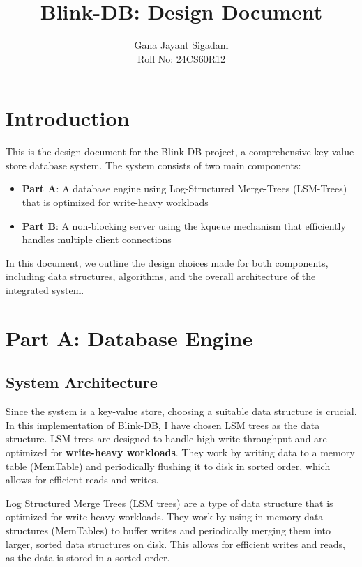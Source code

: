 \documentclass{article}
\title{Blink-DB: Design Document}
\author{
      Gana Jayant Sigadam \\
      Roll No: 24CS60R12 \\
}
\begin{document}
\maketitle

\section{Introduction}
This is the design document for the Blink-DB project, a comprehensive key-value store database system. The system consists of two main components:

\begin{itemize}
    \item \textbf{Part A}: A database engine using Log-Structured Merge-Trees (LSM-Trees) that is optimized for write-heavy workloads
    \item \textbf{Part B}: A non-blocking server using the kqueue mechanism that efficiently handles multiple client connections
\end{itemize}

In this document, we outline the design choices made for both components, including data structures, algorithms, and the overall architecture of the integrated system.

\section{Part A: Database Engine}

\subsection{System Architecture}

Since the system is a key-value store, choosing a suitable data structure is crucial. In this implementation of Blink-DB, I have chosen LSM trees as the data structure. LSM trees are designed to handle high write throughput and are optimized for \textbf{write-heavy workloads}. They work by writing data to a memory table (MemTable) and periodically flushing it to disk in sorted order, which allows for efficient reads and writes.

\noindent Log Structured Merge Trees (LSM trees) are a type of data structure that is optimized for write-heavy workloads. They work by using in-memory data structures (MemTables) to buffer writes and periodically merging them into larger, sorted data structures on disk. This allows for efficient writes and reads, as the data is stored in a sorted order.
\end{document}
